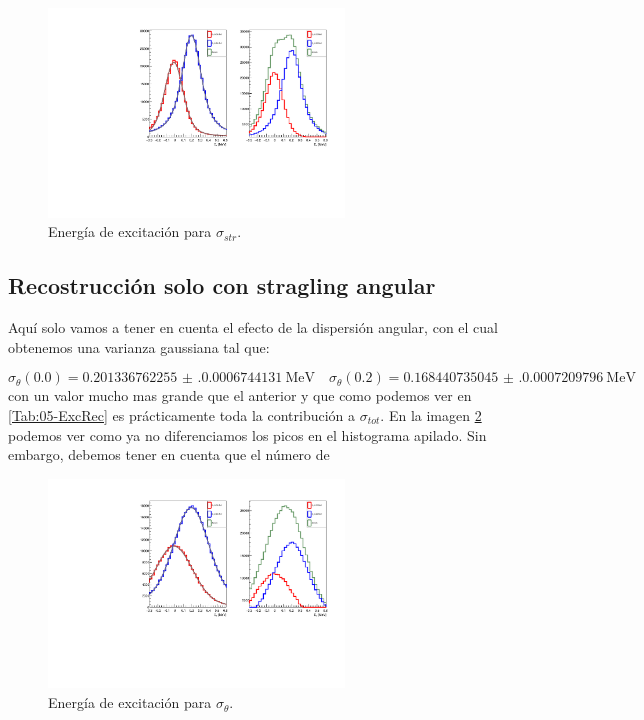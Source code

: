 \vspace*{-0.55cm}
\begin{figure}[H]
    \centering
    \includegraphics[width=0.7\textwidth]{Imagenes/Rec_incIdx1_single.pdf}
    \caption{Energía de excitación para $\sigma_{str}$.}
    \label{Fig:05-RecExcIdx1}
\end{figure}

\subsection{Recostrucción solo con stragling angular}

Aquí solo vamos a tener en cuenta el efecto de la dispersión angular, con el cual obtenemos una varianza gaussiana tal que: 

\begin{equation}
    \sigma_{\theta}(0.0) = \num{0.201336762255(0.0006744131)} \ \text{MeV} \quad 
    \sigma_{\theta}(0.2) = \num{0.168440735045(0.0007209796)} \ \text{MeV}
\end{equation} 
con un valor mucho mas grande que el anterior y que como podemos ver en \cref{Tab:05-ExcRec} es prácticamente toda la contribución a $\sigma_{tot}$. En la imagen \cref{Fig:05-RecExcIdx2} podemos ver como ya no diferenciamos los picos en el histograma apilado. Sin embargo, debemos tener en cuenta que el número de 

\vspace*{-0.25cm}
\begin{figure}[H]
    \centering
    \includegraphics[width=0.7\textwidth]{Imagenes/Rec_incIdx2_single.pdf}
    \caption{Energía de excitación para $\sigma_{\theta}$.}
    \label{Fig:05-RecExcIdx2}
\end{figure}

